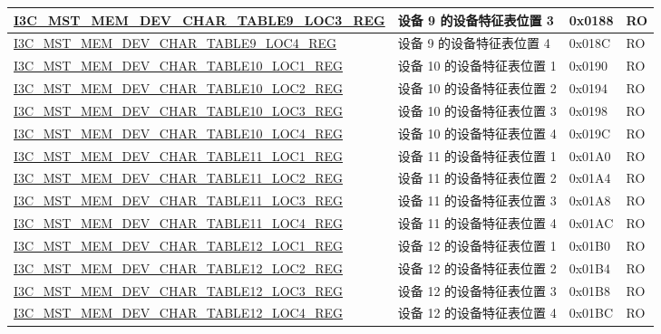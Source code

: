 \begin{longtable}{ | p{8cm} | p{5.5cm} | p{1.3cm} | p{1cm} | }
\hyperref[regdesc:I3CMSTMEMDEVCHARTABLENLOCMREG]{I3C\_MST\_MEM\_DEV\_CHAR\_TABLE9\_LOC3\_REG} & 设备 9 的设备特征表位置 3 & 0x0188 & RO \\ \hline
\hyperref[regdesc:I3CMSTMEMDEVCHARTABLENLOCMREG]{I3C\_MST\_MEM\_DEV\_CHAR\_TABLE9\_LOC4\_REG} & 设备 9 的设备特征表位置 4 & 0x018C & RO \\ \hline
\hyperref[regdesc:I3CMSTMEMDEVCHARTABLENLOCMREG]{I3C\_MST\_MEM\_DEV\_CHAR\_TABLE10\_LOC1\_REG} & 设备 10 的设备特征表位置 1 & 0x0190 & RO \\ \hline
\hyperref[regdesc:I3CMSTMEMDEVCHARTABLENLOCMREG]{I3C\_MST\_MEM\_DEV\_CHAR\_TABLE10\_LOC2\_REG} & 设备 10 的设备特征表位置 2 & 0x0194 & RO \\ \hline
\hyperref[regdesc:I3CMSTMEMDEVCHARTABLENLOCMREG]{I3C\_MST\_MEM\_DEV\_CHAR\_TABLE10\_LOC3\_REG} & 设备 10 的设备特征表位置 3 & 0x0198 & RO \\ \hline
\hyperref[regdesc:I3CMSTMEMDEVCHARTABLENLOCMREG]{I3C\_MST\_MEM\_DEV\_CHAR\_TABLE10\_LOC4\_REG} & 设备 10 的设备特征表位置 4 & 0x019C & RO \\ \hline
\hyperref[regdesc:I3CMSTMEMDEVCHARTABLENLOCMREG]{I3C\_MST\_MEM\_DEV\_CHAR\_TABLE11\_LOC1\_REG} & 设备 11 的设备特征表位置 1 & 0x01A0 & RO \\ \hline
\hyperref[regdesc:I3CMSTMEMDEVCHARTABLENLOCMREG]{I3C\_MST\_MEM\_DEV\_CHAR\_TABLE11\_LOC2\_REG} & 设备 11 的设备特征表位置 2 & 0x01A4 & RO \\ \hline
\hyperref[regdesc:I3CMSTMEMDEVCHARTABLENLOCMREG]{I3C\_MST\_MEM\_DEV\_CHAR\_TABLE11\_LOC3\_REG} & 设备 11 的设备特征表位置 3 & 0x01A8 & RO \\ \hline
\hyperref[regdesc:I3CMSTMEMDEVCHARTABLENLOCMREG]{I3C\_MST\_MEM\_DEV\_CHAR\_TABLE11\_LOC4\_REG} & 设备 11 的设备特征表位置 4 & 0x01AC & RO \\ \hline
\hyperref[regdesc:I3CMSTMEMDEVCHARTABLENLOCMREG]{I3C\_MST\_MEM\_DEV\_CHAR\_TABLE12\_LOC1\_REG} & 设备 12 的设备特征表位置 1 & 0x01B0 & RO \\ \hline
\hyperref[regdesc:I3CMSTMEMDEVCHARTABLENLOCMREG]{I3C\_MST\_MEM\_DEV\_CHAR\_TABLE12\_LOC2\_REG} & 设备 12 的设备特征表位置 2 & 0x01B4 & RO \\ \hline
\hyperref[regdesc:I3CMSTMEMDEVCHARTABLENLOCMREG]{I3C\_MST\_MEM\_DEV\_CHAR\_TABLE12\_LOC3\_REG} & 设备 12 的设备特征表位置 3 & 0x01B8 & RO \\ \hline
\hyperref[regdesc:I3CMSTMEMDEVCHARTABLENLOCMREG]{I3C\_MST\_MEM\_DEV\_CHAR\_TABLE12\_LOC4\_REG} & 设备 12 的设备特征表位置 4 & 0x01BC & RO \\ \hline
\end{longtable}

